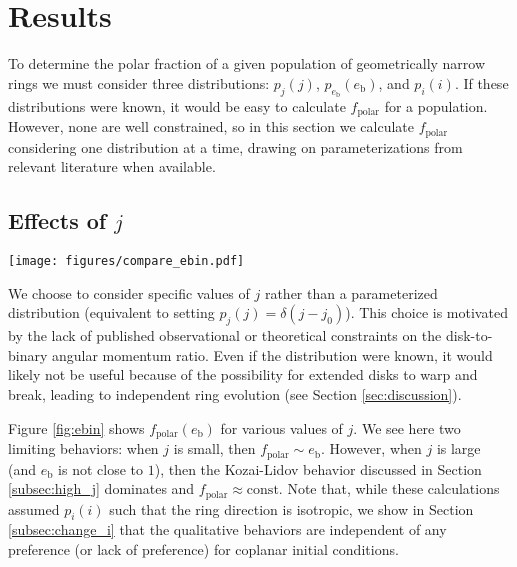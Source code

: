 \documentclass[twocolumn,linenumbers]{aastex631}
\begin{document}
\section{Results}
\label{sec:results}

To determine the polar fraction of a given population of geometrically narrow rings we must consider three distributions: $p_j(j)$, $p_{e_\text{b}}(e_\text{b})$, and $p_i(i)$. If these distributions were known, it would be easy to calculate $f_\text{polar}$ for a population. However, none are well constrained, so in this section we calculate $f_\text{polar}$ considering one distribution at a time, drawing on parameterizations from relevant literature when available.

\subsection{Effects of $j$}
\label{subsec:effect-j}

\begin{figure*}[!htbp]
    \begin{centering}
        \texttt{[image: figures/compare\_ebin.pdf]}
        \caption{
            Polar fraction as a function of $e_{\rm b}$ for various values of $j$. Each line is computed via a numerical integration of equation (\ref{eq:prob_polar}), assuming an isotropic distribution of $i$.
       For low-$j$, the polar fraction is a strong function of $e_{\rm b}$. However, as $j$ increases, $f_{\rm polar}$ becomes insensitive to the binary eccentricity (except for the case that $e_\text{b}\approx 1$). Note that $f_\text{polar}(e_\text{b}\approx 0)$ is maximized when $j=0.5$.
        }
        \label{fig:ebin}
    \end{centering}
\end{figure*}

We choose to consider specific values of $j$ rather than a parameterized distribution (equivalent to setting $p_j(j) = \delta(j-j_0)$). This choice is motivated by the lack of published observational or theoretical constraints on the disk-to-binary angular momentum ratio. Even if the distribution were known, it would likely not be useful because of the possibility for extended disks to warp and break, leading to independent ring evolution (see Section \ref{sec:discussion}).

Figure \ref{fig:ebin} shows $f_\text{polar}(e_\text{b})$ for various values of $j$. We see here two limiting behaviors: when $j$ is small, then $f_\text{polar}\sim e_\text{b}$. However, when $j$ is large (and $e_\text{b}$ is not close to $1$), then the Kozai-Lidov behavior discussed in Section \ref{subsec:high_j} dominates and $f_\text{polar}\approx \text{const}$. Note that, while these calculations assumed $p_i(i)$ such that the ring direction is isotropic, we show in Section \ref{subsec:change_i} that the qualitative behaviors are independent of any preference (or lack of preference) for coplanar initial conditions.
\end{document}
